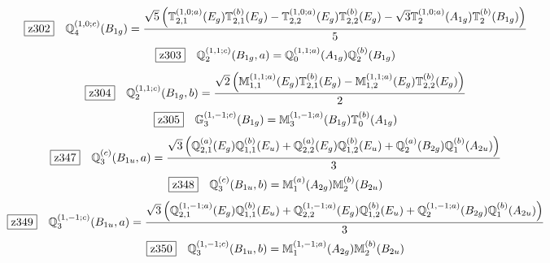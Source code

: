 \documentclass[fleqn,10pt,landscape]{jsarticle}
\begin{document}
\begin{dmath*}
\hspace*{3mm}\fbox{z302}\quad \mathbb{Q}_{4}^{(1,0;c)}(B_{1g})=\frac{\sqrt{5} \left(\mathbb{T}_{2,1}^{(1,0;a)}(E_{g}) \mathbb{T}_{2,1}^{(b)}(E_{g}) - \mathbb{T}_{2,2}^{(1,0;a)}(E_{g}) \mathbb{T}_{2,2}^{(b)}(E_{g}) - \sqrt{3} \mathbb{T}_{2}^{(1,0;a)}(A_{1g}) \mathbb{T}_{2}^{(b)}(B_{1g})\right)}{5}
\end{dmath*}
\begin{dmath*}
\hspace*{3mm}\fbox{z303}\quad \mathbb{Q}_{2}^{(1,1;c)}(B_{1g},a)=\mathbb{Q}_{0}^{(1,1;a)}(A_{1g}) \mathbb{Q}_{2}^{(b)}(B_{1g})
\end{dmath*}
\begin{dmath*}
\hspace*{3mm}\fbox{z304}\quad \mathbb{Q}_{2}^{(1,1;c)}(B_{1g},b)=\frac{\sqrt{2} \left(\mathbb{M}_{1,1}^{(1,1;a)}(E_{g}) \mathbb{T}_{2,1}^{(b)}(E_{g}) - \mathbb{M}_{1,2}^{(1,1;a)}(E_{g}) \mathbb{T}_{2,2}^{(b)}(E_{g})\right)}{2}
\end{dmath*}
\begin{dmath*}
\hspace*{3mm}\fbox{z305}\quad \mathbb{G}_{3}^{(1,-1;c)}(B_{1g})=\mathbb{M}_{3}^{(1,-1;a)}(B_{1g}) \mathbb{T}_{0}^{(b)}(A_{1g})
\end{dmath*}
\begin{dmath*}
\hspace*{3mm}\fbox{z347}\quad \mathbb{Q}_{3}^{(c)}(B_{1u},a)=\frac{\sqrt{3} \left(\mathbb{Q}_{2,1}^{(a)}(E_{g}) \mathbb{Q}_{1,1}^{(b)}(E_{u}) + \mathbb{Q}_{2,2}^{(a)}(E_{g}) \mathbb{Q}_{1,2}^{(b)}(E_{u}) + \mathbb{Q}_{2}^{(a)}(B_{2g}) \mathbb{Q}_{1}^{(b)}(A_{2u})\right)}{3}
\end{dmath*}
\begin{dmath*}
\hspace*{3mm}\fbox{z348}\quad \mathbb{Q}_{3}^{(c)}(B_{1u},b)=\mathbb{M}_{1}^{(a)}(A_{2g}) \mathbb{M}_{2}^{(b)}(B_{2u})
\end{dmath*}
\begin{dmath*}
\hspace*{3mm}\fbox{z349}\quad \mathbb{Q}_{3}^{(1,-1;c)}(B_{1u},a)=\frac{\sqrt{3} \left(\mathbb{Q}_{2,1}^{(1,-1;a)}(E_{g}) \mathbb{Q}_{1,1}^{(b)}(E_{u}) + \mathbb{Q}_{2,2}^{(1,-1;a)}(E_{g}) \mathbb{Q}_{1,2}^{(b)}(E_{u}) + \mathbb{Q}_{2}^{(1,-1;a)}(B_{2g}) \mathbb{Q}_{1}^{(b)}(A_{2u})\right)}{3}
\end{dmath*}
\begin{dmath*}
\hspace*{3mm}\fbox{z350}\quad \mathbb{Q}_{3}^{(1,-1;c)}(B_{1u},b)=\mathbb{M}_{1}^{(1,-1;a)}(A_{2g}) \mathbb{M}_{2}^{(b)}(B_{2u})
\end{dmath*}
\end{document}
